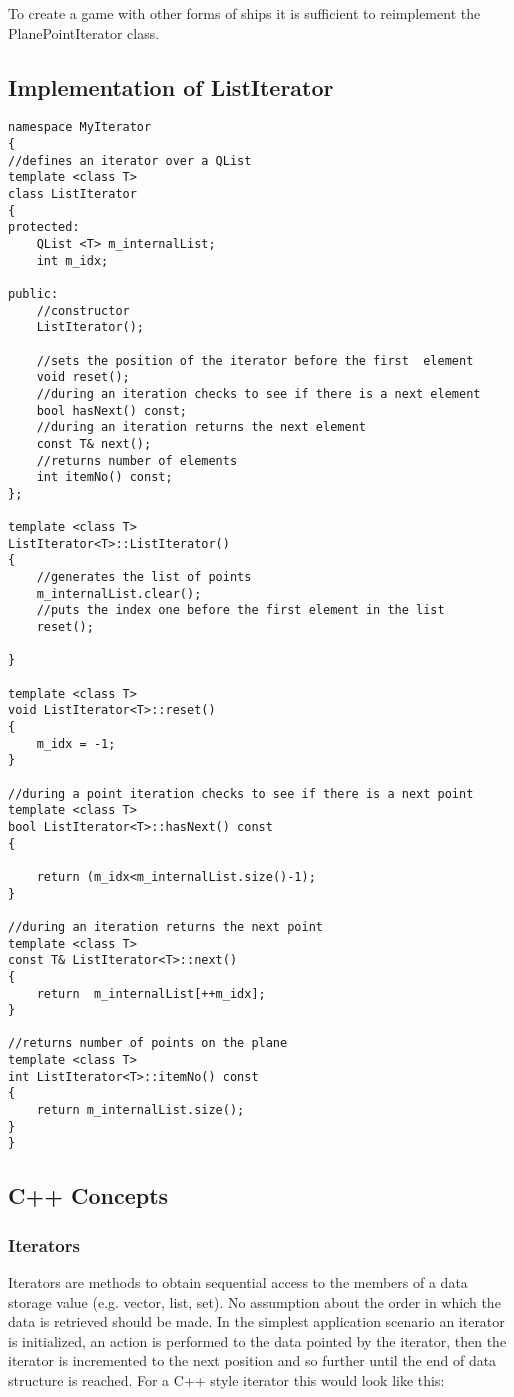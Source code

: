 To create a game with other forms of ships it is sufficient to reimplement the PlanePointIterator class.

\subsection {Implementation of ListIterator}
\begin{lstlisting}
namespace MyIterator
{
//defines an iterator over a QList
template <class T>
class ListIterator
{
protected:
    QList <T> m_internalList;
    int m_idx;

public:
    //constructor
    ListIterator();

    //sets the position of the iterator before the first  element
    void reset();
    //during an iteration checks to see if there is a next element
    bool hasNext() const;
    //during an iteration returns the next element
    const T& next();
    //returns number of elements
    int itemNo() const;
};

template <class T>
ListIterator<T>::ListIterator()
{
    //generates the list of points
    m_internalList.clear();
    //puts the index one before the first element in the list
    reset();

}

template <class T>
void ListIterator<T>::reset()
{
    m_idx = -1;
}

//during a point iteration checks to see if there is a next point
template <class T>
bool ListIterator<T>::hasNext() const
{

    return (m_idx<m_internalList.size()-1);
}

//during an iteration returns the next point
template <class T>
const T& ListIterator<T>::next()
{
    return  m_internalList[++m_idx];
}

//returns number of points on the plane
template <class T>
int ListIterator<T>::itemNo() const
{
    return m_internalList.size();
}
}
\end{lstlisting}

\subsection {C++ Concepts}
\subsubsection {Iterators}

Iterators are methods to obtain sequential access to the members of a data storage value (e.g. vector, list, set). No assumption about the order in which the data is retrieved should be made. In the simplest application scenario an iterator is initialized, an action is performed to the data pointed by the iterator, then the iterator is incremented to the next position and so further until the end of data structure is reached. For a C++ style iterator this would look like this:

